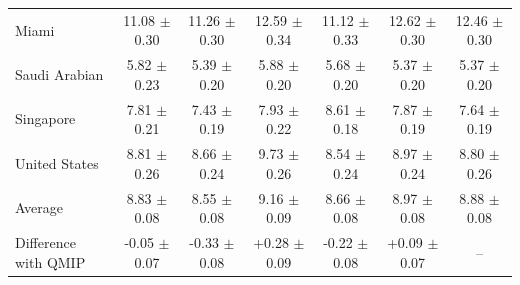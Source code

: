 \begin{tabular}{lcccccc}
Miami & 11.08 $\pm$ 0.30 & 11.26 $\pm$ 0.30 & 12.59 $\pm$ 0.34 & 11.12 $\pm$ 0.33 & 12.62 $\pm$ 0.30 & 12.46 $\pm$ 0.30 \\
Saudi Arabian & 5.82 $\pm$ 0.23 & 5.39 $\pm$ 0.20 & 5.88 $\pm$ 0.20 & 5.68 $\pm$ 0.20 & 5.37 $\pm$ 0.20 & 5.37 $\pm$ 0.20 \\
Singapore & 7.81 $\pm$ 0.21 & 7.43 $\pm$ 0.19 & 7.93 $\pm$ 0.22 & 8.61 $\pm$ 0.18 & 7.87 $\pm$ 0.19 & 7.64 $\pm$ 0.19 \\
United States & 8.81 $\pm$ 0.26 & 8.66 $\pm$ 0.24 & 9.73 $\pm$ 0.26 & 8.54 $\pm$ 0.24 & 8.97 $\pm$ 0.24 & 8.80 $\pm$ 0.26 \\
\midrule
Average & 8.83 $\pm$ 0.08 & 8.55 $\pm$ 0.08 & 9.16 $\pm$ 0.09 & 8.66 $\pm$ 0.08 & 8.97 $\pm$ 0.08 & 8.88 $\pm$ 0.08 \\
Difference with QMIP & -0.05 $\pm$ 0.07 & -0.33 $\pm$ 0.08 & +0.28 $\pm$ 0.09 & -0.22 $\pm$ 0.08 & +0.09 $\pm$ 0.07 & -- \\
\bottomrule
\end{tabular}
